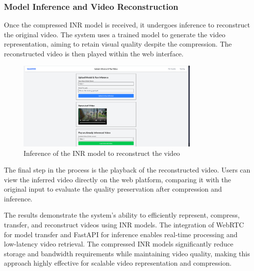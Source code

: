     \subsubsection{Model Inference and Video Reconstruction}
    
    Once the compressed INR model is received, it undergoes inference to reconstruct the original video. The system uses a trained model to generate the video representation, aiming to retain visual quality despite the compression. The reconstructed video is then played within the web interface.
    
    \vspace{10pt}
    \begin{figure}[H]
        \centering
        \includegraphics[width=0.8\textwidth]{assets/website/inferened_result.png}
        \caption{Inference of the INR model to reconstruct the video}
        \label{fig:model_inference}
    \end{figure}
    
    The final step in the process is the playback of the reconstructed video. Users can view the inferred video directly on the web platform, comparing it with the original input to evaluate the quality preservation after compression and inference. 
    
    
    The results demonstrate the system's ability to efficiently represent, compress, transfer, and reconstruct videos using INR models. The integration of WebRTC for model transfer and FastAPI for inference enables real-time processing and low-latency video retrieval. The compressed INR models significantly reduce storage and bandwidth requirements while maintaining video quality, making this approach highly effective for scalable video representation and compression.
    